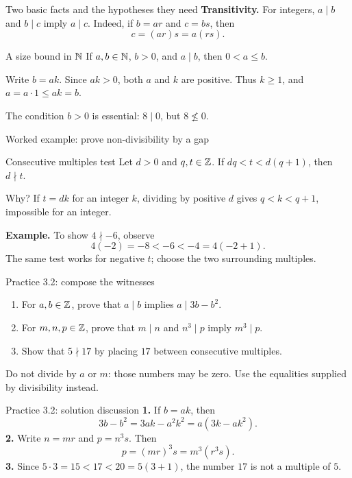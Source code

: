 \begin{frame}{Two basic facts and the hypotheses they need}
\textbf{Transitivity.} For integers, $a\mid b$ and $b\mid c$ imply $a\mid c$.
Indeed, if $b=ar$ and $c=bs$, then
\[
c=(ar)s=a(rs).
\]
\begin{block}{A size bound in $\mathbb{N}$}
If $a,b\in\mathbb{N}$, $b>0$, and $a\mid b$, then $0<a\le b$.
\end{block}
Write $b=ak$. Since $ak>0$, both $a$ and $k$ are positive.
Thus $k\ge1$, and $a=a\cdot1\le ak=b$.
\medskip

The condition $b>0$ is essential: $8\mid0$, but $8\nleq0$.
\end{frame}

\begin{frame}{Worked example: prove non-divisibility by a gap}
\begin{block}{Consecutive multiples test}
Let $d>0$ and $q,t\in\mathbb{Z}$. If $dq<t<d(q+1)$, then $d\nmid t$.
\end{block}
Why? If $t=dk$ for an integer $k$, dividing by positive $d$ gives
$q<k<q+1$, impossible for an integer.
\medskip

\textbf{Example.} To show $4\nmid-6$, observe
\[
4(-2)=-8<-6<-4=4(-2+1).
\]
The same test works for negative $t$; choose the two surrounding multiples.
\end{frame}

\begin{frame}{Practice 3.2: compose the witnesses}
\begin{enumerate}
\item For $a,b\in\mathbb{Z}$, prove that $a\mid b$ implies $a\mid3b-b^2$.
\item For $m,n,p\in\mathbb{Z}$, prove that $m\mid n$ and $n^3\mid p$ imply $m^3\mid p$.
\item Show that $5\nmid17$ by placing $17$ between consecutive multiples.
\end{enumerate}
Do not divide by $a$ or $m$: those numbers may be zero.
Use the equalities supplied by divisibility instead.
\end{frame}

\begin{frame}{Practice 3.2: solution discussion}
\textbf{1.} If $b=ak$, then
\[
3b-b^2=3ak-a^2k^2=a(3k-ak^2).
\]
\textbf{2.} Write $n=mr$ and $p=n^3s$. Then
\[
p=(mr)^3s=m^3(r^3s).
\]
\textbf{3.} Since $5\cdot3=15<17<20=5(3+1)$, the number $17$ is not a multiple of $5$.
\end{frame}

